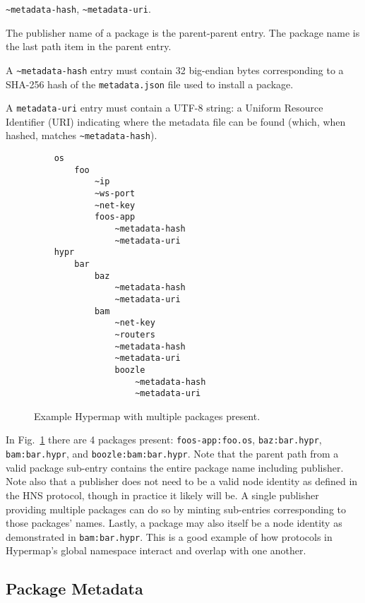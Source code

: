 \documentclass[runningheads]{llncs}
\begin{document}
\verb|~metadata-hash|, \verb|~metadata-uri|.

The publisher name of a package is the parent-parent entry.
The package name is the last path item in the parent entry.

A \verb|~metadata-hash| entry must contain 32 big-endian bytes corresponding to a SHA-256 hash of the \verb|metadata.json| file used to install a package.

A \verb|metadata-uri| entry must contain a UTF-8 string: a Uniform Resource Identifier (URI) indicating where the metadata file can be found (which, when hashed, matches \verb|~metadata-hash|).

\begin{figure}[H]
    \centering
    \begin{verbatim}
    os
        foo
            ~ip
            ~ws-port
            ~net-key
            foos-app
                ~metadata-hash
                ~metadata-uri
    hypr
        bar
            baz
                ~metadata-hash
                ~metadata-uri
            bam
                ~net-key
                ~routers
                ~metadata-hash
                ~metadata-uri
                boozle
                    ~metadata-hash
                    ~metadata-uri
    \end{verbatim}
    \caption{Example Hypermap with multiple packages present.}
    \label{fig:example hypermap with packages}
\end{figure}

In Fig.~\ref{fig:example hypermap with packages} there are 4 packages present: \verb|foos-app:foo.os|, \verb|baz:bar.hypr|, \verb|bam:bar.hypr|, and \verb|boozle:bam:bar.hypr|.
Note that the parent path from a valid package sub-entry contains the entire package name including publisher.
Note also that a publisher does not need to be a valid node identity as defined in the HNS protocol, though in practice it likely will be.
A single publisher providing multiple packages can do so by minting sub-entries corresponding to those packages' names.
Lastly, a package may also itself be a node identity as demonstrated in \verb|bam:bar.hypr|.
This is a good example of how protocols in Hypermap's global namespace interact and overlap with one another.

\subsection{Package Metadata}
\label{sec:packagemanagermetadata}
\end{document}
